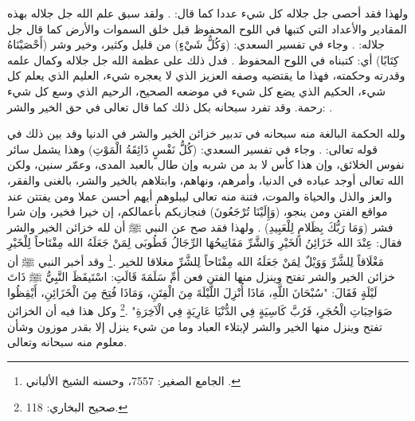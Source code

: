 ولهذا فقد أحصى جل جلاله كل شيء عددا كما قال:
\quranayah*[72][28][10]{\footnotesize \surahname*[72]}. ولقد سبق علم الله جل جلاله بهذه المقادير والأعداد التي كتبها في اللوح المحفوظ قبل خلق السموات والأرض كما قال جل جلاله: \quranayah*[78][29]{\footnotesize \surahname*[78]}. وجاء في تفسير السعدي: (وَكُلُّ شَيْءٍ) من قليل وكثير، وخير وشر (أَحْصَيْنَاهُ كِتَابًا) أي: كتبناه في اللوح المحفوظ \href{https://shamela.ws/book/42/2064#p9}{\faExternalLink} \cite{tafsir_Saadi}. فدل ذلك على عظمة الله جل جلاله وكمال علمه وقدرته وحكمته، فهذا ما يقتضيه وصفه العزيز الذي لا يعجره شيء، العليم الذي يعلم كل شيء، الحكيم الذي يضع كل شيء في موضعه الصحيح، الرحيم الذي وسع كل شيء رحمة. وقد تفرد سبحانه بكل ذلك كما قال تعالى في حق الخير والشر: 
\quranayah*[10][107]{\footnotesize \surahname*[10]}.

ولله الحكمة البالغة منه سبحانه في تدبير خزائن الخير والشر في الدنيا وقد بين ذلك  في قوله تعالى: \quranayah*[21][35]{\footnotesize \surahname*[21]}. وجاء في تفسير السعدي:  (كُلُّ نَفْسٍ ذَائِقَةُ الْمَوْتِ) وهذا يشمل سائر نفوس الخلائق، وإن هذا كأس لا بد من شربه وإن طال بالعبد المدى، وعمّر سنين، ولكن الله تعالى أوجد عباده في الدنيا، وأمرهم، ونهاهم، وابتلاهم بالخير والشر، بالغنى والفقر، والعز والذل والحياة والموت، فتنة منه تعالى ليبلوهم أيهم أحسن عملا ومن يفتتن عند مواقع الفتن ومن ينجو، (وَإِلَيْنَا تُرْجَعُونَ) فنجازيكم بأعمالكم، إن خيرا فخير، وإن شرا فشر (وَمَا رَبُّكَ بِظَلامٍ لِلْعَبِيدِ) \href{https://shamela.ws/book/42/1178#p3}{\faExternalLink} \cite{tafsir_Saadi}. ولهذا فقد صح عن النبي ﷺ أن لله خزائن الخير والشر فقال: عِنْدَ الله خَزَائِنُ الخَيْرِ وَالشَّرِّ مَفَاتِيحُهَا الرِّجَالُ فَطُوبَى لِمَنْ جَعَلَهُ الله مِفْتَاحاً لِلْخَيْرِ مَغْلَاقاً لِلشَّرِّ وَوَيْلٌ لِمَنْ جَعَلَهُ الله مِفْتَاحاً لِلشَّرِّ مغلاقا للخير \href{https://shamela.ws/book/21659/7557#p1}{\faExternalLink} \cite{jamaaSagheer}.\footnote{الجامع الصغير: 7557، وحسنه الشيخ الألباني .} وقد أخبر النبي ﷺ أن خزائن الخير والشر تفتح وينزل منها الفتن فعن أُمِّ سَلَمَةَ قَالَتِ: اسْتَيقَظَ النَّبِيُّ ﷺ ذَاتَ لَيْلَةٍ فَقَالَ: "سُبْحَانَ اللَّهِ، مَاذَا أُنْزِلَ اللَّيْلَةَ مِنَ الْفِتَنِ، وَمَاذَا فُتِحَ مِنَ الْخَزَائِنِ، أَيْقِظُوا صَوَاحِبَاتِ الْحُجَرِ، فَرُبَّ كَاسِيَةٍ فِي الدُّنْيَا عَارِيَةٍ فِي الْآخِرَةِ" \href{https://shamela.ws/book/1284/251#p1}{\faExternalLink} \cite{bukhari}.\footnote{صحيح البخاري: 118.} وكل هذا فيه أن الخزائن تفتح وينزل منها الخير والشر لإبتلاء العباد وما من شيء ينزل إلا بقدر موزون وشأن معلوم منه سبحانه وتعالى.

